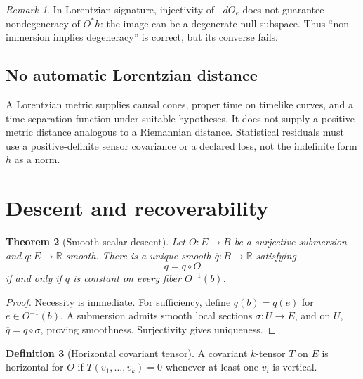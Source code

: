 \documentclass[11pt,a4paper]{article}
\theoremstyle{definition}
\newtheorem{definition}{Definition}[section]
\theoremstyle{plain}
\newtheorem{theorem}[definition]{Theorem}
\theoremstyle{remark}
\newtheorem{remark}[definition]{Remark}
\newcommand{\R}{\mathbb{R}}
\newcommand{\dd}{\mathop{}\!d}
\begin{document}
\begin{remark}
In Lorentzian signature, injectivity of $\dd O_e$ does not guarantee
nondegeneracy of $O^*h$: the image can be a degenerate null subspace.
Thus ``non-immersion implies degeneracy'' is correct, but its converse
fails.
\end{remark}

\subsection{No automatic Lorentzian distance}

A Lorentzian metric supplies causal cones, proper time on timelike curves,
and a time-separation function under suitable hypotheses. It does not
supply a positive metric distance analogous to a Riemannian distance.
Statistical residuals must use a positive-definite sensor covariance or a
declared loss, not the indefinite form $h$ as a norm.

\section{Descent and recoverability}

\begin{theorem}[Smooth scalar descent]
Let $O:E\to B$ be a surjective submersion and $q:E\to\R$ smooth. There is
a unique smooth $\overline q:B\to\R$ satisfying
\[
q=\overline q\circ O
\]
if and only if $q$ is constant on every fiber $O^{-1}(b)$.
\end{theorem}
\begin{proof}
Necessity is immediate. For sufficiency, define
$\overline q(b)=q(e)$ for $e\in O^{-1}(b)$. A submersion admits smooth
local sections $\sigma:U\to E$, and on $U$,
$\overline q=q\circ\sigma$, proving smoothness. Surjectivity gives
uniqueness.
\end{proof}

\begin{definition}[Horizontal covariant tensor]
A covariant $k$-tensor $T$ on $E$ is horizontal for $O$ if
$T(v_1,\ldots,v_k)=0$ whenever at least one $v_i$ is vertical.
\end{definition}
\end{document}
